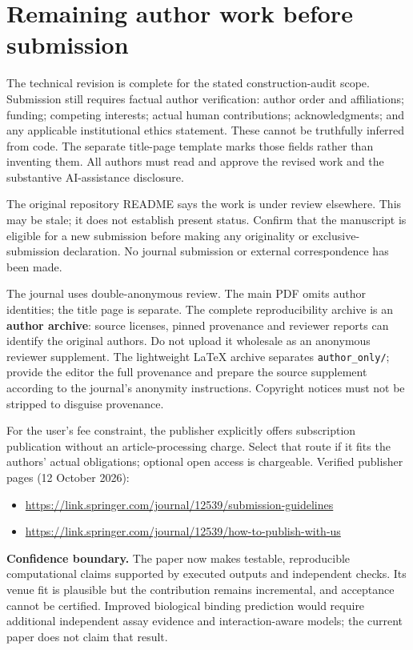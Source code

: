 \documentclass[11pt,a4paper]{article}
\begin{document}
\section{Remaining author work before submission}
The technical revision is complete for the stated construction-audit scope. Submission still requires factual author verification: author order and affiliations; funding; competing interests; actual human contributions; acknowledgments; and any applicable institutional ethics statement. These cannot be truthfully inferred from code. The separate title-page template marks those fields rather than inventing them. All authors must read and approve the revised work and the substantive AI-assistance disclosure.

The original repository README says the work is under review elsewhere. This may be stale; it does not establish present status. Confirm that the manuscript is eligible for a new submission before making any originality or exclusive-submission declaration. No journal submission or external correspondence has been made.

The journal uses double-anonymous review. The main PDF omits author identities; the title page is separate. The complete reproducibility archive is an \textbf{author archive}: source licenses, pinned provenance and reviewer reports can identify the original authors. Do not upload it wholesale as an anonymous reviewer supplement. The lightweight LaTeX archive separates \texttt{author\_only/}; provide the editor the full provenance and prepare the source supplement according to the journal's anonymity instructions. Copyright notices must not be stripped to disguise provenance.

For the user's fee constraint, the publisher explicitly offers subscription publication without an article-processing charge. Select that route if it fits the authors' actual obligations; optional open access is chargeable. Verified publisher pages (12 October 2026):
\begin{itemize}
\item \url{https://link.springer.com/journal/12539/submission-guidelines}
\item \url{https://link.springer.com/journal/12539/how-to-publish-with-us}
\end{itemize}
\textbf{Confidence boundary.} The paper now makes testable, reproducible computational claims supported by executed outputs and independent checks. Its venue fit is plausible but the contribution remains incremental, and acceptance cannot be certified. Improved biological binding prediction would require additional independent assay evidence and interaction-aware models; the current paper does not claim that result.
\end{document}

